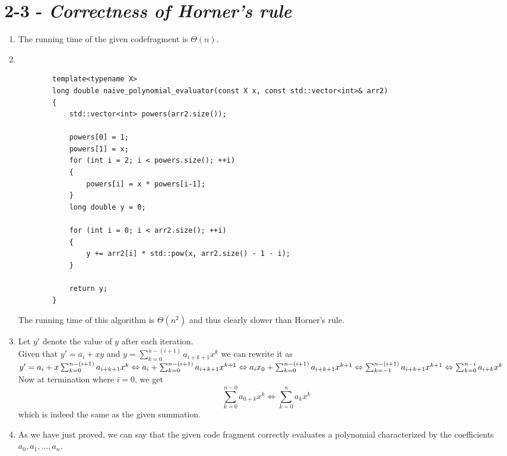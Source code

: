 \documentclass[11pt, letterpaper]{article}
\begin{document}
\section*{2-3 - \textit{Correctness of Horner's rule}}
\begin{enumerate}[label=\alph*)]
    \item
        The running time of the given codefragment is $\Theta (n)$.
    \item
        ~\\
        \begin{lstlisting}
        template<typename X>
        long double naive_polynomial_evaluator(const X x, const std::vector<int>& arr2)
        {
            std::vector<int> powers(arr2.size());

            powers[0] = 1;
            powers[1] = x;
            for (int i = 2; i < powers.size(); ++i)
            {
                powers[i] = x * powers[i-1];
            }
            long double y = 0;

            for (int i = 0; i < arr2.size(); ++i)
            {
                y += arr2[i] * std::pow(x, arr2.size() - 1 - i);
            }

            return y;
        }
        \end{lstlisting}
        The running time of this algorithm is $\Theta (n^2)$ and thus clearly slower 
        than Horner's rule.
    \item
        Let $y'$ denote the value of $y$ after each iteration.\\
        Given that $y' = a_i + xy$ and $y = \sum_{k=0}^{n-(i+1)} a_{i+k+1}x^k$ we 
        can rewrite it as \\$y'=a_i + x \sum_{k=0}^{n-(i+1)} a_{i+k+1}x^k\\
        \Leftrightarrow
        a_i + \sum_{k=0}^{n-(i+1)} a_{i+k+1}x^{k+1}\\
        \Leftrightarrow
        a_i x_0 + \sum_{k=0}^{n-(i+1)} a_{i+k+1}x^{k+1}\\
        \Leftrightarrow
        \sum_{k=-1}^{n-(i+1)} a_{i+k+1}x^{k+1}\\
        \Leftrightarrow
        \sum_{k=0}^{n-i} a_{i+k}x^{k}\\
        $
        Now at termination where $i = 0$, we get
        \begin{equation}
        \sum_{k=0}^{n-0} a_{0+k}x^{k} \Leftrightarrow \sum_{k=0}^{n} a_{k}x^{k}
        \end{equation}
        which is indeed the same as the given summation.
    \item
        As we have just proved, we can say that the given code fragment correctly
        evaluates a polynomial characterized by the coefficients $a_0,a_1,\dots,a_n$.
\end{enumerate}
\pagebreak
\end{document}
